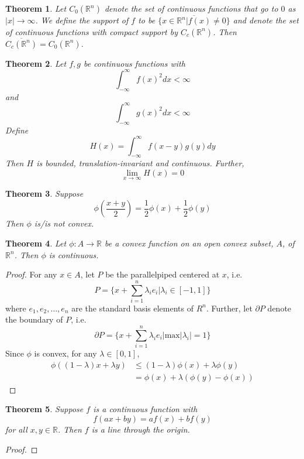 \documentclass[12pt,leqno]{article}
\numberwithin{equation}{section}
\newtheorem{thm}{Theorem}[section]
\theoremstyle{definition}
\begin{document}
\begin{thm}
 Let $C_0(\mathbb{R}^n)$ denote the set of continuous functions that go to $0$ as $|x|\to\infty$. We define the support of $f$ to be $\overline{\{x\in\mathbb{R}^n|f(x)\not=0\}}$ and denote the set of continuous functions with compact support by $C_c(\mathbb{R}^n)$. Then $\overline{C_c(\mathbb{R}^n)}=C_0(\mathbb{R}^n)$.
\end{thm}

\begin{thm}
Let $f,g$ be continuous functions with \[\int_{-\infty}^{\infty}f(x)^2dx<\infty\] and \[\int_{-\infty}^{\infty}g(x)^2dx<\infty\] Define \[H(x)=\int_{-\infty}^{\infty}f(x-y)g(y)dy\]
Then $H$ is bounded, translation-invariant and continuous. Further, \[\displaystyle\lim_{x\to\infty}H(x)=0\]
\end{thm}

\begin{thm}
 Suppose \[\phi\left(\frac{x+y}{2}\right)=\frac{1}{2}\phi(x)+\frac{1}{2}\phi(y)\] Then $\phi$ is/is not convex.
\end{thm}

\begin{thm}
 Let $\phi:A\to\mathbb{R}$ be a convex function on an open convex subset, $A$, of $\mathbb{R}^n$. Then $\phi$ is continuous.
\end{thm}

\begin{proof}
 For any $x\in A$, let $P$ be the parallelpiped centered at $x$, i.e. \[P=\{x+\sum_{i=1}^n\lambda_ie_i|\lambda_i\in[-1,1]\}\] where $e_1,e_2,\hdots,e_n$ are the standard basis elements of $R^n$. Further, let $\partial P$ denote the boundary of $P$, i.e. \[\partial P=\{x+\sum_{i=1}^n\lambda_ie_i|\text{max}|\lambda_i|=1\}\] Since $\phi$ is convex, for any $\lambda\in[0,1]$, \begin{align*}\phi((1-\lambda)x+\lambda y)&\leq(1-\lambda)\phi(x)+\lambda\phi(y)\\&=\phi(x)+\lambda(\phi(y)-\phi(x))\end{align*}
\end{proof}


\begin{thm}
 Suppose $f$ is a continuous function with \[f(ax+by)=af(x)+bf(y)\] for all $x,y\in\mathbb{R}$. Then $f$ is a line through the origin.
\end{thm}

\begin{proof}

\end{proof}
\end{document}
